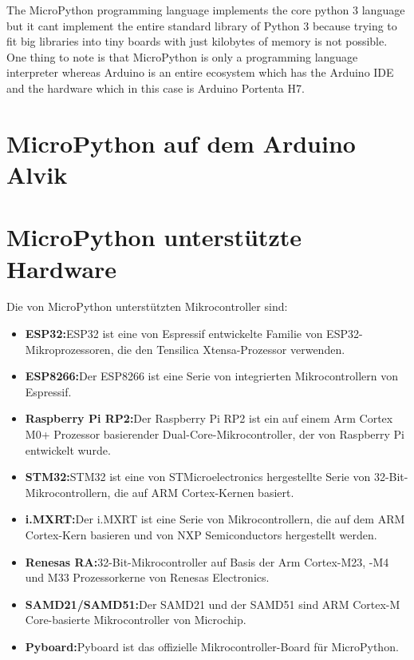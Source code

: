 The MicroPython programming language implements the core python 3 language but it cant implement the entire standard library of Python 3 because trying to fit big libraries into tiny boards with just kilobytes of memory is not possible. One thing to
note is that MicroPython is only a programming language interpreter whereas Arduino is an entire ecosystem which has the Arduino IDE and the hardware which in this case is Arduino Portenta H7.


\section{MicroPython auf dem Arduino Alvik}


\section{MicroPython unterstützte Hardware}

Die von MicroPython unterstützten Mikrocontroller sind:
\begin{itemize}
	\item \textbf{ESP32:}ESP32 ist eine von Espressif entwickelte Familie von ESP32-Mikroprozessoren, die den Tensilica Xtensa-Prozessor verwenden.
	\item \textbf{ESP8266:}Der ESP8266 ist eine Serie von integrierten Mikrocontrollern von Espressif.
	\item \textbf{Raspberry Pi RP2:}Der Raspberry Pi RP2 ist ein auf einem Arm Cortex M0+ Prozessor basierender Dual-Core-Mikrocontroller, der von Raspberry Pi entwickelt wurde.
	\item \textbf{STM32:}STM32 ist eine von STMicroelectronics hergestellte Serie von 32-Bit-Mikrocontrollern, die auf ARM Cortex-Kernen basiert.
	\item \textbf{i.MXRT:}Der i.MXRT ist eine Serie von Mikrocontrollern, die auf dem ARM Cortex-Kern basieren und von NXP Semiconductors hergestellt werden.
	\item \textbf{Renesas RA:}32-Bit-Mikrocontroller auf Basis der Arm Cortex-M23, -M4 und M33 Prozessorkerne von Renesas Electronics.
	\item \textbf{SAMD21/SAMD51:}Der SAMD21 und der SAMD51 sind ARM Cortex-M Core-basierte Mikrocontroller von Microchip.
	\item \textbf{Pyboard:}Pyboard ist das offizielle Mikrocontroller-Board für MicroPython.
\end{itemize}
